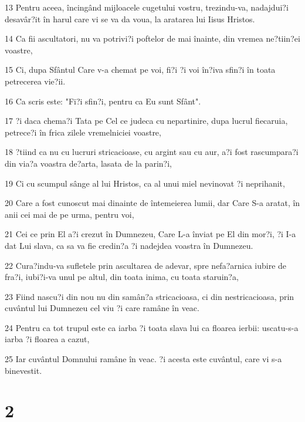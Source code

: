 \par 13 Pentru aceea, încingând mijloacele cugetului vostru, trezindu-va, nadajdui?i desavâr?it în harul care vi se va da voua, la aratarea lui Iisus Hristos.
\par 14 Ca fii ascultatori, nu va potrivi?i poftelor de mai înainte, din vremea ne?tiin?ei voastre,
\par 15 Ci, dupa Sfântul Care v-a chemat pe voi, fi?i ?i voi în?iva sfin?i în toata petrecerea vie?ii.
\par 16 Ca scris este: "Fi?i sfin?i, pentru ca Eu sunt Sfânt".
\par 17 ?i daca chema?i Tata pe Cel ce judeca cu nepartinire, dupa lucrul fiecaruia, petrece?i în frica zilele vremelniciei voastre,
\par 18 ?tiind ca nu cu lucruri stricacioase, cu argint sau cu aur, a?i fost rascumpara?i din via?a voastra de?arta, lasata de la parin?i,
\par 19 Ci cu scumpul sânge al lui Hristos, ca al unui miel nevinovat ?i neprihanit,
\par 20 Care a fost cunoscut mai dinainte de întemeierea lumii, dar Care S-a aratat, în anii cei mai de pe urma, pentru voi,
\par 21 Cei ce prin El a?i crezut în Dumnezeu, Care L-a înviat pe El din mor?i, ?i I-a dat Lui slava, ca sa va fie credin?a ?i nadejdea voastra în Dumnezeu.
\par 22 Cura?indu-va sufletele prin ascultarea de adevar, spre nefa?arnica iubire de fra?i, iubi?i-va unul pe altul, din toata inima, cu toata staruin?a,
\par 23 Fiind nascu?i din nou nu din samân?a stricacioasa, ci din nestricacioasa, prin cuvântul lui Dumnezeu cel viu ?i care ramâne în veac.
\par 24 Pentru ca tot trupul este ca iarba ?i toata slava lui ca floarea ierbii: uscatu-s-a iarba ?i floarea a cazut,
\par 25 Iar cuvântul Domnului ramâne în veac. ?i acesta este cuvântul, care vi s-a binevestit.

\chapter{2}

